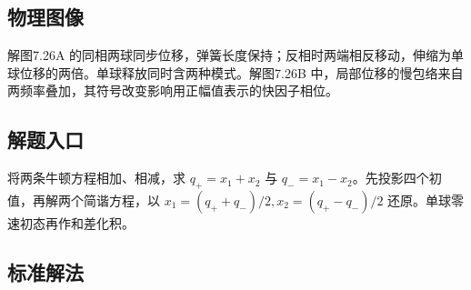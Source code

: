 \documentclass[UTF8,fontset=fandol,a4paper,11pt]{ctexart}
\begin{document}


\subsection*{物理图像}

解图7.26A 的同相两球同步位移，弹簧长度保持；反相时两端相反移动，伸缩为单球位移的两倍。单球释放同时含两种模式。解图7.26B 中，局部位移的慢包络来自两频率叠加，其符号改变影响用正幅值表示的快因子相位。




\subsection*{解题入口}

将两条牛顿方程相加、相减，求 $q_+=x_1+x_2$ 与 $q_-=x_1-x_2$。先投影四个初值，再解两个简谐方程，以 $x_1=(q_++q_-)/2,x_2=(q_+-q_-)/2$ 还原。单球零速初态再作和差化积。



\subsection*{标准解法}
\end{document}
